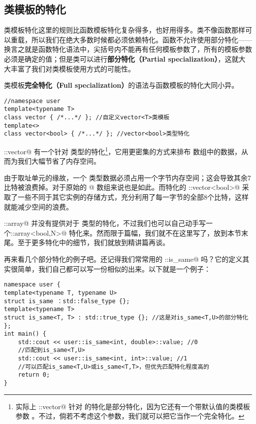 \subsection*{类模板的特化}
类模板特化这里的规则比函数模板特化复杂得多，也好用得多。类不像函数那样可以重载，所以我们在绝大多数时候都必须依赖特化。函数不允许使用部分特化——换言之就是函数特化语法中，尖括号内不能再有任何模板参数了，所有的模板参数必须是确定的值；但是类可以进行\textbf{部分特化（Partial specialization）}，这就大大丰富了我们对类模板使用方式的可能性。\par
类模板\textbf{完全特化（Full specialization）}的语法与函数模板的特化大同小异。
\begin{lstlisting}
//namespace user
template<typename T>
class vector { /*...*/ }; //自定义vector<T>类模板
template<>
class vector<bool> { /*...*/ }; //vector<bool>类型特化
\end{lstlisting}\par
\lstinline@std::vector@ 有一个针对 \lstinline@bool@ 类型的特化\footnote{实际上 \lstinline@std::vector@ 针对 \lstinline@bool@ 的特化是部分特化，因为它还有一个带默认值的类模板参数 \lstinline@Allocator@。不过，倘若不考虑这个参数，我们就可以把它当作一个完全特化。}，它用更密集的方式来排布 \lstinline@bool@ 数组中的数据，从而为我们大幅节省了内存空间。\par
由于取址单元的缘故，一个 \lstinline@bool@ 类型数据必须占用一个字节内存空间；这会导致其余7比特被浪费掉。对于原始的 \lstinline@bool[]@ 数组来说也是如此。而特化的 \lstinline@std::vector<bool>@ 采取了一些不同于其它实例的存储方式，充分利用了每一字节的全部8个比特，这样就能减少空间的浪费。\par
\lstinline@std::array@ 并没有提供对于 \lstinline@bool@ 类型的特化，不过我们也可以自己动手写一个\newline\lstinline@user::array<bool,N>@ 特化来。然而限于篇幅，我们就不在这里写了，放到本节末尾。至于更多特化中的细节，我们就放到精讲篇再谈。\par
再来看几个部分特化的例子吧。还记得我们常常用的 \lstinline@std::is_same@ 吗？它的定义其实很简单，我们自己都可以写一份相似的出来。以下就是一个例子：
\begin{lstlisting}
namespace user {
template<typename T, typename U>
struct is_same ：std::false_type {};
template<typename T>
struct is_same<T, T> : std::true_type {}; //这是对is_same<T,U>的部分特化
};
int main() {
    std::cout << user::is_same<int, double>::value; //0
    //匹配到is_same<T,U>
    std::cout << user::is_same<int, int>::value; //1
    //可以匹配is_same<T,U>或is_same<T,T>，但优先匹配特化程度高的
    return 0;
}
\end{lstlisting}\par
